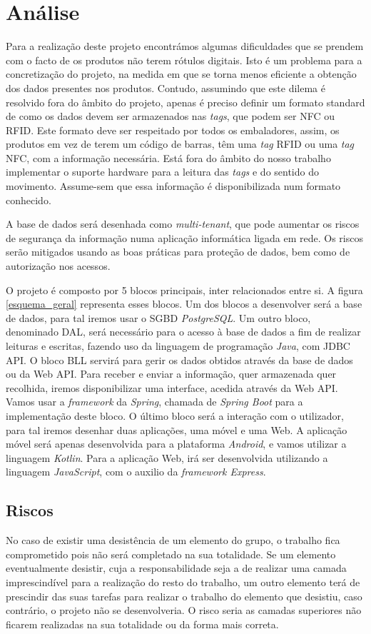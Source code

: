 %
%
\section*{Análise} \label{Analise}

Para a realização deste projeto encontrámos algumas dificuldades que se prendem com o facto de os produtos não terem rótulos digitais. Isto é um problema para a concretização do projeto, na medida em que se torna menos eficiente a obtenção dos dados presentes nos produtos. Contudo, assumindo que este dilema é resolvido fora do âmbito do projeto, apenas é preciso definir um formato standard de como os dados devem ser armazenados nas \textit{tags}, que podem ser NFC ou RFID. Este formato deve ser respeitado por todos os embaladores, assim, os produtos em vez de terem um código de barras, têm uma \textit{tag} RFID ou uma \textit{tag} NFC, com a informação necessária. Está fora do âmbito do nosso trabalho implementar o suporte hardware para a leitura das \textit{tags} e do sentido do movimento. Assume-sem que essa informação é disponibilizada num formato conhecido. 

A base de dados será desenhada como \textit{multi-tenant}, que pode aumentar os riscos de segurança da informação numa aplicação informática ligada em rede. Os riscos serão mitigados usando as boas práticas para proteção de dados, bem como de autorização nos acessos.

O projeto é composto por 5 blocos principais, inter relacionados entre si. A figura \ref{esquema_geral} representa esses blocos. Um dos blocos a desenvolver será a base de dados, para tal iremos usar o SGBD \textit{PostgreSQL}. Um outro bloco, denominado DAL, será necessário para o acesso à base de dados a fim de realizar leituras e escritas, fazendo uso da linguagem de programação \textit{Java}, com JDBC API. O bloco BLL servirá para gerir os dados obtidos através da base de dados ou da Web API. Para receber e enviar a informação, quer armazenada quer recolhida, iremos disponibilizar uma interface, acedida através da Web API. Vamos usar a \textit{framework} da \textit{Spring}, chamada de \textit{Spring Boot} para a implementação deste bloco. O último bloco será a interação com o utilizador, para tal iremos desenhar duas aplicações, uma móvel e uma Web. A aplicação móvel será apenas desenvolvida para a plataforma \textit{Android}, e vamos utilizar a linguagem \textit{Kotlin}. Para a aplicação Web, irá ser desenvolvida utilizando a linguagem \textit{JavaScript}, com o auxilio da \textit{framework Express}.

\subsection*{Riscos}
No caso de existir uma desistência de um elemento do grupo, o trabalho fica comprometido pois não será completado na sua totalidade. Se um elemento eventualmente desistir, cuja a responsabilidade seja a de realizar uma camada imprescindível para a realização do resto do trabalho, um outro elemento terá de prescindir das suas tarefas para realizar o trabalho do elemento que desistiu, caso contrário, o projeto não se desenvolveria. O risco seria as camadas superiores não ficarem realizadas na sua totalidade ou da forma mais correta.